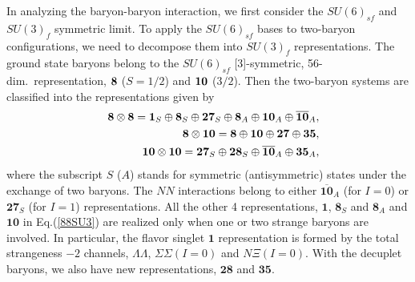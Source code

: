 \documentclass[aps,prd,showpacs,floatfix,reprint,nofootinbib]{revtex4-1}
\newcommand \cc[1]{{\bm {#1}}}
\newcommand \cb[1]{\overline{\bm {#1}}}
\begin{document}
In analyzing the baryon-baryon interaction, we first consider the $SU(6)_{sf}$ and $SU(3)_f$ symmetric limit.
To apply the $SU(6)_{sf}$ bases to two-baryon configurations, we need to 
decompose them into $SU(3)_f$ representations.
The ground state baryons belong to the $SU(6)_{sf}$ [3]-symmetric, 56-dim.\ representation,
${\bf 8}$ ($S=1/2$) and ${\bf 10}$ ($3/2$).
Then the two-baryon systems are classified into the representations given by
\begin{eqnarray}
&& {} {\bf 8} \otimes {\bf 8} = {\bf 1}_S \oplus {\bf 8}_S \oplus {\bf 27}_S \oplus {\bf 8}_A \oplus {\bf 10}_A
\oplus \overline{\bf 10}_A,
\label{88SU3}\\
&& {} {\bf 8} \otimes {\bf 10} = {\bf 8} \oplus {\bf 10} \oplus {\bf 27} \oplus  {\bf 35}, \\
&& {} {\bf 10} \otimes {\bf 10} =  {\bf 27}_S \oplus {\bf 28}_S \oplus \overline{\bf 10}_A \oplus {\bf 35}_A ,
\end{eqnarray}
where the subscript $S$ ($A$) stands for symmetric (antisymmetric) states under the exchange of two baryons.
The $NN$ interactions belong to either $\cb{10}_A$ (for $I=0$) or $\cc{27}_S$ (for $I=1$) representations.
All the other 4 representations, $\cc1$, $\cc 8_S$ and $\cc 8_A$ and $\cc{10}$ in Eq.(\ref{88SU3}) 
are realized only when one or two strange baryons are involved.
In particular, the flavor singlet $\cc1$ representation is formed by the total strangeness $-2$ channels, 
$\Lambda\Lambda$, $\Sigma\Sigma (I=0)$ and $N\Xi (I=0)$.
With the decuplet baryons, we also have new representations, $\cc{28}$ and $\cc{35}$.
\end{document}
